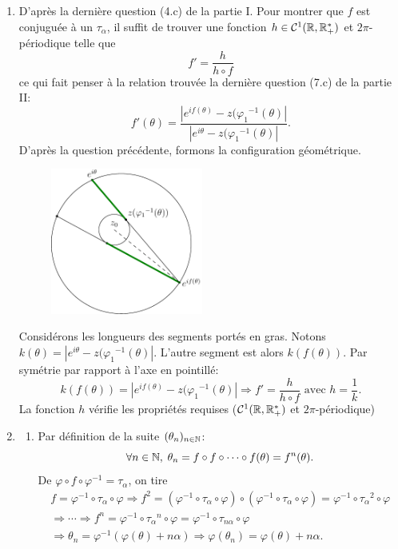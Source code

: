\begin{enumerate}
\item D'après la dernière question (4.c) de la partie I. Pour montrer que $f$ est conjuguée à un $\tau_\alpha$, il suffit de trouver une fonction $h\in \mathcal{C}^{1}(\mathbb{R}, \mathbb{R}_{+}^{*})$ et $2\pi$-périodique telle que 
\[
  f' = \frac{h}{h\circ f}
\]
ce qui fait penser à la relation trouvée la dernière question (7.c) de la partie II:
\[
  f'(\theta) = \frac{\left|e^{if(\theta)} - z({\varphi_1}^{-1}(\theta)\right|}{\left|e^{i\theta} - z({\varphi_1}^{-1}(\theta)\right|}.
\]
D'après la question précédente, formons la configuration géométrique.
\begin{figure}[h!]
  \centering
  \includegraphics[width=5cm]{Cponcelet_1.pdf}
\end{figure}
Considérons les longueurs des segments portés en gras.\newline
Notons $k(\theta) = \left|e^{i\theta} - z({\varphi_1}^{-1}(\theta)\right|$. L'autre segment est alors $k(f(\theta))$. Par symétrie par rapport à l'axe en pointillé:
\[
  k(f(\theta)) = \left|e^{if(\theta)} - z({\varphi_1}^{-1}(\theta)\right| \Rightarrow f' = \frac{h}{h\circ f} \text{ avec } h = \frac{1}{k}.
\]
La fonction $h$ vérifie les propriétés requises ($\mathcal{C}^{1}(\mathbb{R}, \mathbb{R}_{+}^{*})$ et $2\pi$-périodique) 
\item
\begin{enumerate}
  \item Par définition de la suite $(\theta_{n})_{n\in \mathbb{N}}$:
\[
  \forall n \in \mathbb{N}, \; \theta_n = f \circ f \circ \cdots \circ f (\theta) = f^n(\theta).
\]
De $\varphi \circ f \circ \varphi^{-1} = \tau_\alpha$, on tire
\begin{multline*}
  f = \varphi^{-1} \circ \tau_\alpha \circ \varphi \Rightarrow f^2 = (\varphi^{-1} \circ \tau_\alpha \circ \varphi) \circ (\varphi^{-1} \circ \tau_\alpha \circ \varphi)
  = \varphi^{-1} \circ {\tau_{\alpha}}^2 \circ \varphi \\
  \Rightarrow \cdots \Rightarrow f^n = \varphi^{-1} \circ {\tau_{\alpha}}^n \circ \varphi
  = \varphi^{-1} \circ {\tau_{n \alpha}} \circ \varphi \\
  \Rightarrow \theta_n = \varphi^{-1}(\varphi(\theta) + n\alpha)
  \Rightarrow \varphi(\theta_n) = \varphi(\theta) + n\alpha.
\end{multline*}


\end{enumerate}
\end{enumerate}
